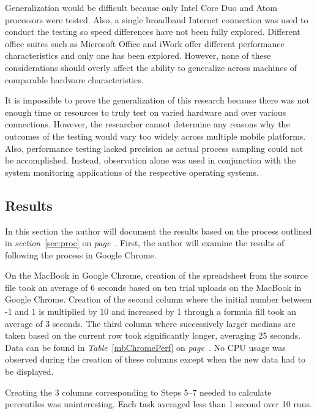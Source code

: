 
Generalization would be difficult because only Intel Core Duo and Atom
processors were tested.  Also, a single broadband Internet connection was used
to conduct the testing so speed differences have not been fully explored.
Different office suites such as Microsoft Office and iWork offer different
performance characteristics and only one has been explored.  However, none of
these considerations should overly affect the ability to generalize across
machines of comparable hardware characteristics.

It is impossible to prove the generalization of this research because there was
not enough time or resources to truly test on varied hardware and over various
connections.  However, the researcher cannot determine any reasons why the
outcomes of the testing would vary too widely across multiple mobile platforms.
Also, performance testing lacked precision as actual process sampling could not
be accomplished.  Instead, observation alone was used in conjunction with the
system monitoring applications of the respective operating systems.

\subsection{Results}

In this section the author will document the results based on the process
outlined in \emph{section}~\ref{sec:proc} on \emph{page}~\pageref{sec:proc}.  First, the
author will examine the results of following the process in Google Chrome.

On the MacBook in Google Chrome, creation of the spreadsheet from the source
file took an average of 6 seconds based on ten trial uploads on the MacBook in
Google Chrome.  Creation of the second column where the initial number between
-1 and 1 is multiplied by 10 and increased by 1 through a formula fill took an
average of 3 seconds.  The third column where successively larger medians are
taken based on the current row took significantly longer, averaging 25 seconds.
Data can be found in \emph{Table}~\ref{mbChromePerf} on \emph{page}~\pageref{mbChromePerf}.
No CPU usage was observed during the creation of these columns except when the
new data had to be displayed.



Creating the 3 columns corresponding to Steps 5--7 needed to calculate
percentiles was uninteresting.  Each task averaged less than 1 second over 10
runs.


